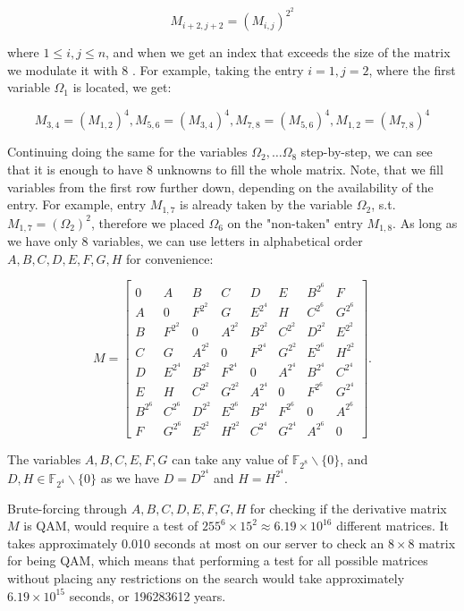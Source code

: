 \documentclass[10pt]{article}
\begin{document}
$$
M_{i+2, j+2}=\left(M_{i, j}\right)^{2^{2}}
$$

where $1 \leq i, j \leq n$, and when we get an index that exceeds the size of the matrix we modulate it with 8 . For example, taking the entry $i=1, j=2$, where the first variable $\Omega_{1}$ is located, we get:

$$
M_{3,4}=\left(M_{1,2}\right)^{4}, M_{5,6}=\left(M_{3,4}\right)^{4}, M_{7,8}=\left(M_{5,6}\right)^{4}, M_{1,2}=\left(M_{7,8}\right)^{4}
$$

Continuing doing the same for the variables $\Omega_{2}, \ldots \Omega_{8}$ step-by-step, we can see that it is enough to have 8 unknowns to fill the whole matrix. Note, that we fill variables from the first row further down, depending on the availability of the entry. For example, entry $M_{1,7}$ is already taken by the variable $\Omega_{2}$, s.t. $M_{1,7}=\left(\Omega_{2}\right)^{2}$, therefore we placed $\Omega_{6}$ on the "non-taken" entry $M_{1,8}$. As long as we have only 8 variables, we can use letters in alphabetical order $A, B, C, D, E, F, G, H$ for convenience:

\[
M=\left[\begin{array}{cccccccc}
0 & A & B & C & D & E & B^{2^{6}} & F  \tag{11}\\
A & 0 & F^{2^{2}} & G & E^{2^{4}} & H & C^{2^{6}} & G^{2^{6}} \\
B & F^{2^{2}} & 0 & A^{2^{2}} & B^{2^{2}} & C^{2^{2}} & D^{2^{2}} & E^{2^{2}} \\
C & G & A^{2^{2}} & 0 & F^{2^{4}} & G^{2^{2}} & E^{2^{6}} & H^{2^{2}} \\
D & E^{2^{4}} & B^{2^{2}} & F^{2^{4}} & 0 & A^{2^{4}} & B^{2^{4}} & C^{2^{4}} \\
E & H & C^{2^{2}} & G^{2^{2}} & A^{2^{4}} & 0 & F^{2^{6}} & G^{2^{4}} \\
B^{2^{6}} & C^{2^{6}} & D^{2^{2}} & E^{2^{6}} & B^{2^{4}} & F^{2^{6}} & 0 & A^{2^{6}} \\
F & G^{2^{6}} & E^{2^{2}} & H^{2^{2}} & C^{2^{4}} & G^{2^{4}} & A^{2^{6}} & 0
\end{array}\right] .
\]

The variables $A, B, C, E, F, G$ can take any value of $\mathbb{F}_{2^{8}} \backslash\{0\}$, and $D, H \in \mathbb{F}_{2^{4}} \backslash\{0\}$ as we have $D=D^{2^{4}}$ and $H=H^{2^{4}}$.

Brute-forcing through $A, B, C, D, E, F, G, H$ for checking if the derivative matrix $M$ is QAM, would require a test of $255^{6} \times 15^{2} \approx 6.19 \times 10^{16}$ different matrices. It takes approximately 0.010 seconds at most on our server to check an $8 \times 8$ matrix for being QAM, which means that performing a test for all possible matrices without placing any restrictions on the search would take approximately $6.19 \times 10^{15}$ seconds, or 196283612 years.
\end{document}
